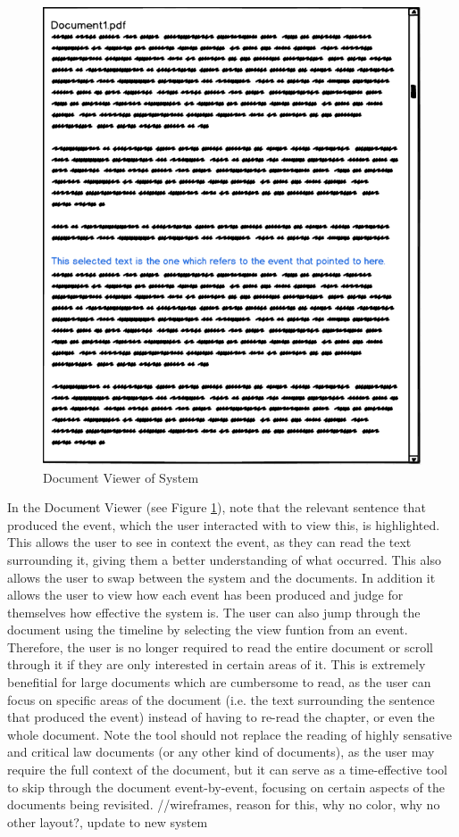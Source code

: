 \begin{figure}[h]
\caption{Document Viewer of System}
\label{fig:viewDoc}
\includegraphics[scale=0.75]{viewDoc.png}
\centering
\end{figure}
\par In the Document Viewer (see Figure \ref{fig:viewDoc}), note that the relevant sentence that produced the event, which the user interacted with to view this, is highlighted. This allows the user to see in context the event, as they can read the text surrounding it, giving them a better understanding of what occurred. This also allows the user to swap between the system and the documents. In addition it allows the user to view how each event has been produced and judge for themselves how effective the system is. The user can also jump through the document using the timeline by selecting the view funtion from an event. Therefore, the user is no longer required to read the entire document or scroll through it if they are only interested in certain areas of it. This is extremely benefitial for large documents which are cumbersome to read, as the user can focus on specific areas of the document (i.e. the text surrounding the sentence that produced the event) instead of having to re-read the chapter, or even the whole document. Note the tool should not replace the reading of highly sensative and critical law documents (or any other kind of documents), as the user may require the full context of the document, but it can serve as a time-effective tool to skip through the document event-by-event, focusing on certain aspects of the documents being revisited.
//wireframes, reason for this, why no color, why no other layout?, update to new system










